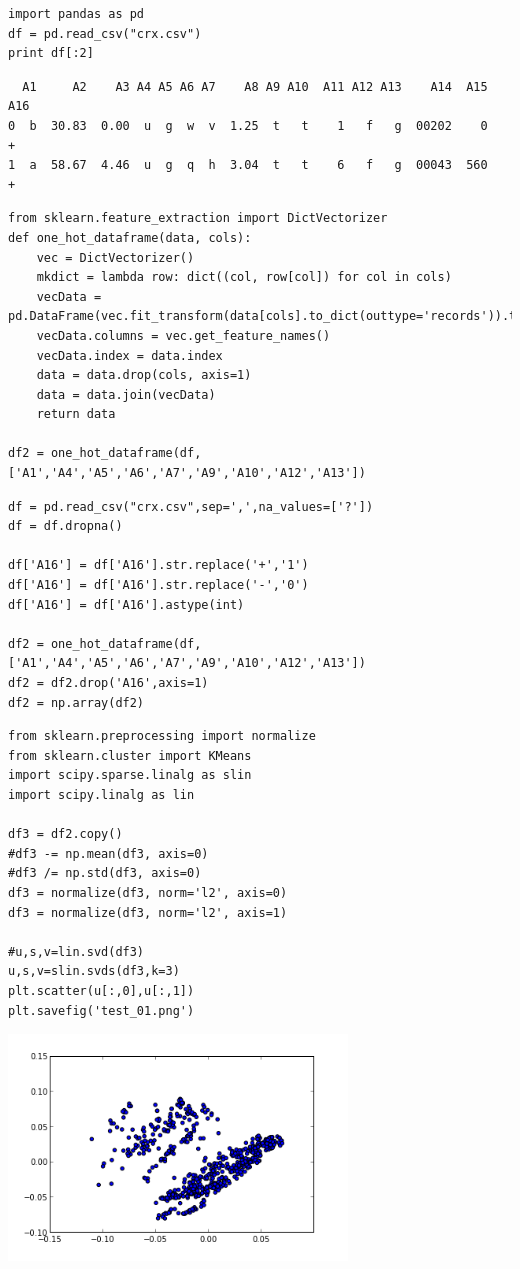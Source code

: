 \documentclass[12pt,fleqn]{article}\usepackage{../common}
\begin{document}
\begin{verbatim}
import pandas as pd
df = pd.read_csv("crx.csv")
print df[:2]
\end{verbatim}

\begin{verbatim}
  A1     A2    A3 A4 A5 A6 A7    A8 A9 A10  A11 A12 A13    A14  A15 A16
0  b  30.83  0.00  u  g  w  v  1.25  t   t    1   f   g  00202    0   +
1  a  58.67  4.46  u  g  q  h  3.04  t   t    6   f   g  00043  560   +
\end{verbatim}

\begin{verbatim}
from sklearn.feature_extraction import DictVectorizer
def one_hot_dataframe(data, cols):
    vec = DictVectorizer()
    mkdict = lambda row: dict((col, row[col]) for col in cols)
    vecData = pd.DataFrame(vec.fit_transform(data[cols].to_dict(outtype='records')).toarray())
    vecData.columns = vec.get_feature_names()
    vecData.index = data.index
    data = data.drop(cols, axis=1)
    data = data.join(vecData)
    return data

df2 = one_hot_dataframe(df,['A1','A4','A5','A6','A7','A9','A10','A12','A13'])
\end{verbatim}


\begin{verbatim}
df = pd.read_csv("crx.csv",sep=',',na_values=['?'])
df = df.dropna()

df['A16'] = df['A16'].str.replace('+','1')
df['A16'] = df['A16'].str.replace('-','0')
df['A16'] = df['A16'].astype(int)

df2 = one_hot_dataframe(df,['A1','A4','A5','A6','A7','A9','A10','A12','A13'])
df2 = df2.drop('A16',axis=1)
df2 = np.array(df2)
\end{verbatim}

\begin{verbatim}
from sklearn.preprocessing import normalize
from sklearn.cluster import KMeans
import scipy.sparse.linalg as slin
import scipy.linalg as lin

df3 = df2.copy()
#df3 -= np.mean(df3, axis=0)
#df3 /= np.std(df3, axis=0)
df3 = normalize(df3, norm='l2', axis=0)
df3 = normalize(df3, norm='l2', axis=1)

#u,s,v=lin.svd(df3)
u,s,v=slin.svds(df3,k=3)
plt.scatter(u[:,0],u[:,1])
plt.savefig('test_01.png')
\end{verbatim}

\includegraphics[height=6cm]{test_01.png}
\end{document}

